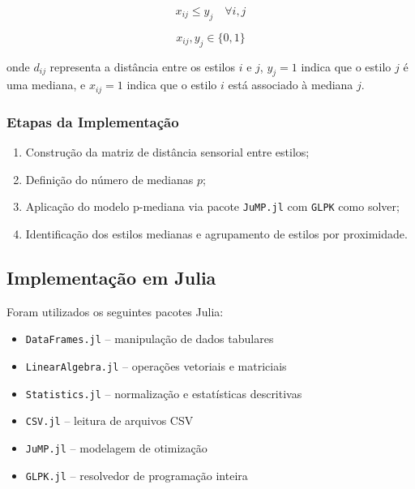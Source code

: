 \documentclass[12pt,a4paper]{article}
\begin{document}
\begin{equation}
x_{ij} \leq y_j \quad \forall i,j
\end{equation}

\begin{equation}
x_{ij}, y_j \in \{0,1\}
\end{equation}

onde $d_{ij}$ representa a dist\^ancia entre os estilos $i$ e $j$, $y_j = 1$ indica que o estilo $j$ \'{e} uma mediana, e $x_{ij} = 1$ indica que o estilo $i$ est\'a associado \`a mediana $j$.

\subsubsection{Etapas da Implementa\c{c}\~ao}

\begin{enumerate}
    \item Constru\c{c}\~ao da matriz de dist\^ancia sensorial entre estilos;
    \item Defini\c{c}\~ao do n\'umero de medianas $p$;
    \item Aplica\c{c}\~ao do modelo p-mediana via pacote \texttt{JuMP.jl} com \texttt{GLPK} como solver;
    \item Identifica\c{c}\~ao dos estilos medianas e agrupamento de estilos por proximidade.
\end{enumerate}

\subsection{Implementa\c{c}\~ao em Julia}

Foram utilizados os seguintes pacotes Julia:

\begin{itemize}
\item \texttt{DataFrames.jl} -- manipula\c{c}\~ao de dados tabulares
\item \texttt{LinearAlgebra.jl} -- opera\c{c}\~oes vetoriais e matriciais
\item \texttt{Statistics.jl} -- normaliza\c{c}\~ao e estat\'isticas descritivas
\item \texttt{CSV.jl} -- leitura de arquivos CSV
\item \texttt{JuMP.jl} -- modelagem de otimiza\c{c}\~ao
\item \texttt{GLPK.jl} -- resolvedor de programa\c{c}\~ao inteira
\end{itemize}
\end{document}

